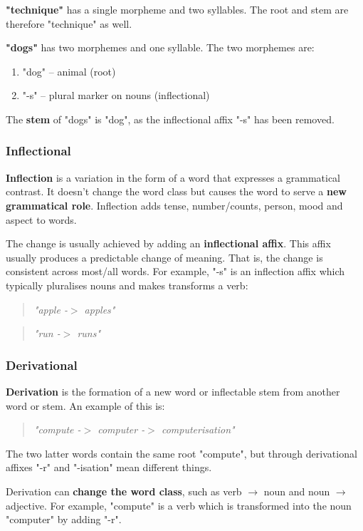 \documentclass{article}
\begin{document}
\textbf{"technique"} has a single morpheme and two syllables. The root and stem are therefore "technique" as well.

\textbf{"dogs"} has two morphemes and one syllable. The two morphemes are:
\begin{enumerate}
	\item "dog" -- animal (root)
	\item "-s" -- plural marker on nouns (inflectional)
\end{enumerate}
 The \textbf{stem} of "dogs" is "dog", as the inflectional affix "-s" has been removed.
 
\subsubsection{Inflectional}

\textbf{Inflection} is a variation in the form of a word that expresses a grammatical contrast. It doesn't change the word class but causes the word to serve a \textbf{new grammatical role}. Inflection adds tense, number/counts, person, mood and aspect to words.

The change is usually achieved by adding an \textbf{inflectional affix}. This affix usually produces a predictable change of meaning. That is, the change is consistent across most/all words. For example, "-s" is an inflection affix which typically pluralises nouns and makes transforms a verb:
\begin{quote}
	\textit{"apple -$>$ apples"}
\end{quote}
\begin{quote}
	\textit{"run -$>$ runs"}
\end{quote}

\subsubsection{Derivational}

\textbf{Derivation} is the formation of a new word or inflectable stem from another word or stem. An example of this is:
\begin{quote}
	\textit{"compute -$>$ computer -$>$ computerisation"}
\end{quote}
The two latter words contain the same root "compute", but through derivational affixes "-r" and "-isation" mean different things.

Derivation can \textbf{change the word class}, such as verb $\rightarrow$ noun and noun $\rightarrow$ adjective. For example, "compute" is a verb which is transformed into the noun "computer" by adding "-r".
\end{document}
